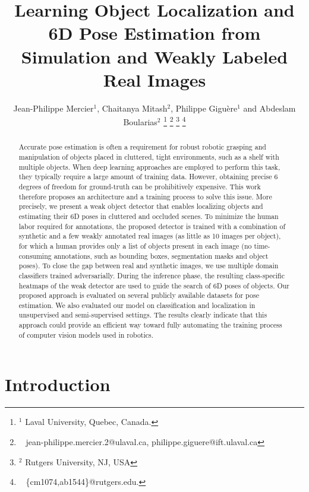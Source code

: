 \documentclass[letterpaper, 10 pt, conference]{ieeeconf}  %
\title{\LARGE \bf
Learning Object Localization and 6D Pose Estimation from Simulation and Weakly Labeled Real Images
}
\author{Jean-Philippe Mercier$^{1}$, Chaitanya Mitash$^{2}$, Philippe Gigu\`ere$^{1}$ and Abdeslam Boularias$^{2}$%
 \thanks{$^{1}$ Laval University, Quebec, Canada.}
 \thanks{$\enspace $ jean-philippe.mercier.2@ulaval.ca, philippe.giguere@ift.ulaval.ca}
 \thanks{$^{2}$ Rutgers University, NJ, USA}%
 \thanks{$\enspace$ \{cm1074,ab1544\}@rutgers.edu.}
 }
\begin{document}
\maketitle
\thispagestyle{empty}
\pagestyle{empty}




\begin{abstract}
Accurate pose estimation is often a requirement for robust robotic grasping and manipulation of objects placed in cluttered, tight environments, such as a shelf with multiple objects. When deep learning approaches are employed to perform this task, they typically require a large amount of training data. However, obtaining precise 6 degrees of freedom for ground-truth can be prohibitively expensive. This work therefore proposes an architecture and a training process to solve this issue. More precisely, we present a weak object detector that enables localizing objects and estimating their 6D poses in cluttered and occluded scenes. To minimize the human labor required for annotations, the proposed detector is trained with a combination of synthetic and a few weakly annotated real images (as little as 10 images per object), for which a human provides only a list of objects present in each image (no time-consuming annotations, such as bounding boxes, segmentation masks and object poses). To close the gap between real and synthetic images, we use multiple domain classifiers trained adversarially. During the inference phase, the resulting class-specific heatmaps of the weak detector are used to guide the search of 6D poses of objects. Our proposed approach is evaluated on several publicly available datasets for pose estimation. We also evaluated our model on classification and localization in unsupervised and semi-supervised settings. The results clearly indicate that this approach could provide an efficient way toward fully automating the training process of computer vision models used in robotics.




\end{abstract}



\section{Introduction}\label{sec:intro}
\end{document}
